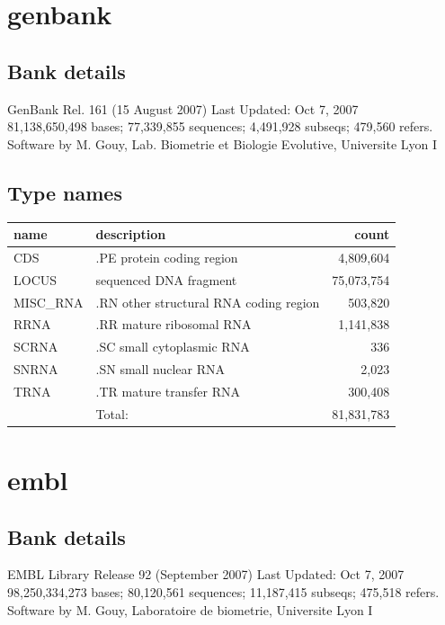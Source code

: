 \documentclass{article}
\begin{document}
\begin{Schunk}
\section{ genbank }
\subsection{Bank details}
GenBank Rel. 161 (15 August 2007) Last Updated: Oct  7, 2007\\
81,138,650,498 bases; 77,339,855 sequences; 4,491,928 subseqs; 479,560 refers.\\
Software by M. Gouy, Lab. Biometrie et Biologie Evolutive, Universite Lyon I

\subsection{Type names}
\noindent\begin{tabular}{llr}
\hline \hline
name & description & count \\
\hline
CDS  &  .PE protein coding region  &  4,809,604 \\
LOCUS  &  sequenced DNA fragment  &  75,073,754 \\
MISC\_RNA  &  .RN other structural RNA coding region  &  503,820 \\
RRNA  &  .RR mature ribosomal RNA  &  1,141,838 \\
SCRNA  &  .SC small cytoplasmic RNA  &  336 \\
SNRNA  &  .SN small nuclear RNA  &  2,023 \\
TRNA  &  .TR mature transfer RNA  &  300,408 \\
\hline
 & Total: & 81,831,783 \\
\hline \hline
\end{tabular}

\section{ embl }
\subsection{Bank details}
EMBL Library Release 92 (September 2007) Last Updated: Oct  7, 2007\\
98,250,334,273 bases; 80,120,561 sequences; 11,187,415 subseqs; 475,518 refers.\\
Software by M. Gouy, Laboratoire de biometrie, Universite Lyon I


\end{Schunk}
\end{document}
